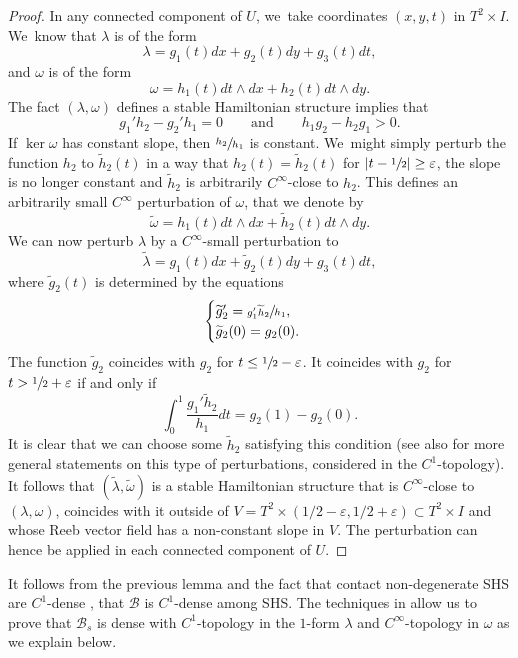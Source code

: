 \documentclass[JEP,XML,SOM,Unicode,NoEqCountersInSection,NoFloatCountersInSection,published]{cedram}
\theoremstyle{definition}
\begin{document}
\begin{proof}
In any connected component of $U$, we~take coordinates $(x,y,t)$ in $T^2\times I$. We~know that $\lambda$ is of the form
\[
\lambda= g_1(t) dx + g_2(t) dy + g_3(t)dt,
\]
and $\omega$ is of the form
\[
\omega= h_1(t)dt\wedge dx + h_2(t)dt\wedge dy.
\]
The fact $(\lambda,\omega)$ defines a stable Hamiltonian structure implies that
\[
g_1'h_2-g_2'h_1=0 \qquad \mbox{and} \qquad h_1g_2-h_2g_1>0.
\]
If $\ker \omega$ has constant slope, then $\sfrac{h_2}{h_1}$ is constant. We~might simply perturb the function $h_2$ to $\widetilde h_2(t)$ in a way that $h_2(t)=\widetilde h_2(t)$ for $|t-\sfrac{1}{2}|\geq \varepsilon$, the slope is no longer constant and $\widetilde h_2$ is arbitrarily $C^\infty$-close to $h_2$. This defines an arbitrarily small $C^\infty$ perturbation of $\omega$, that we denote by
\[
\widetilde \omega= h_1(t) dt\wedge dx + \widetilde h_2(t) dt\wedge dy.
\]
We can now perturb $\lambda$ by a $C^\infty$-small perturbation to
\[
\widetilde \lambda= g_1(t)dx+ \widetilde g_2(t)dy+g_3(t)dt,
\]
where $\widetilde g_2(t)$ is determined by the equations
\begin{equation*}
\begin{cases}
\widetilde g_2'=\sfrac{g_1'\widetilde h_2}{h_1},\\
\widetilde g_2(0)=g_2(0).
\end{cases}
\end{equation*}
The function $\widetilde g_2$ coincides with $g_2$ for $t\leq \sfrac{1}{2}-\varepsilon$. It coincides with $g_2$ for $t > \sfrac{1}{2}+\varepsilon$ if and only if
\[
\int_0^1 \frac{g_1'\widetilde h_2}{h_1}dt=g_2(1)-g_2(0).
\]
It is clear that we can choose some $\widetilde h_2$ satisfying this condition (see also \cite[Lem.\,3.15]{CV1} for more general statements on this type of perturbations, considered in the $C^1$\nobreakdash-topo\-logy). It follows that $(\widetilde \lambda,\widetilde \omega)$ is a stable Hamiltonian structure that is $C^\infty$-close to $(\lambda,\omega)$, coincides with it outside of $V=T^2\times(1/2-\varepsilon,1/2+\varepsilon)\subset T^2\times I$ and whose Reeb vector field has a non-constant slope in $V$. The perturbation can hence be applied in each connected component of $U$.
\end{proof}

It follows from the previous lemma and the fact that contact non-degenerate SHS are $C^1$-dense \cite[Th.\,4.6]{CV1}, that $\mathcal{B}$ is $C^1$-dense among SHS. The techniques in \cite[Th.\,4.6]{CV1} allow us to prove that $\mathcal{B}_s$ is dense with $C^1$-topology in the $1$-form $\lambda$ and $C^\infty$-topology in $\omega$ as we explain below.
\end{document}
